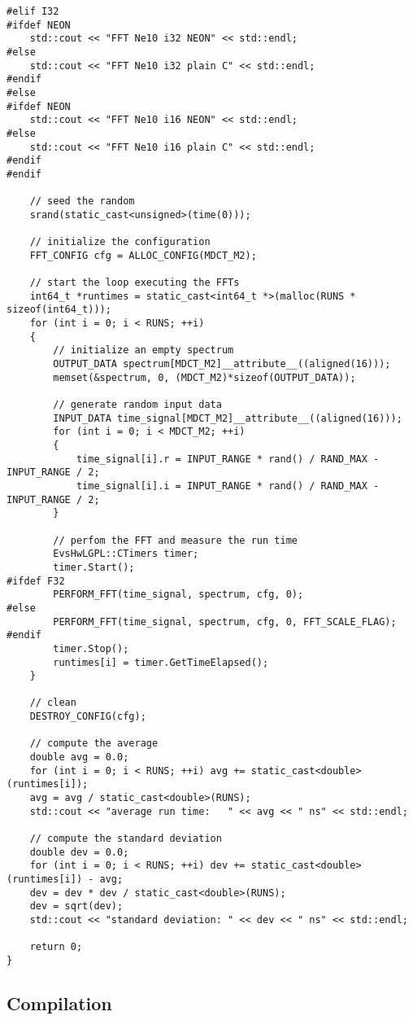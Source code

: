 \documentclass{article}
\begin{document}
\begin{lstlisting}
#elif I32
#ifdef NEON
    std::cout << "FFT Ne10 i32 NEON" << std::endl;
#else
    std::cout << "FFT Ne10 i32 plain C" << std::endl;
#endif
#else
#ifdef NEON
    std::cout << "FFT Ne10 i16 NEON" << std::endl;
#else
    std::cout << "FFT Ne10 i16 plain C" << std::endl;
#endif
#endif

    // seed the random
    srand(static_cast<unsigned>(time(0)));

    // initialize the configuration
    FFT_CONFIG cfg = ALLOC_CONFIG(MDCT_M2);

    // start the loop executing the FFTs
    int64_t *runtimes = static_cast<int64_t *>(malloc(RUNS * sizeof(int64_t)));
    for (int i = 0; i < RUNS; ++i)
    {
        // initialize an empty spectrum
        OUTPUT_DATA spectrum[MDCT_M2]__attribute__((aligned(16)));
        memset(&spectrum, 0, (MDCT_M2)*sizeof(OUTPUT_DATA));

        // generate random input data
        INPUT_DATA time_signal[MDCT_M2]__attribute__((aligned(16)));
        for (int i = 0; i < MDCT_M2; ++i)
        {
            time_signal[i].r = INPUT_RANGE * rand() / RAND_MAX - INPUT_RANGE / 2;
            time_signal[i].i = INPUT_RANGE * rand() / RAND_MAX - INPUT_RANGE / 2;
        }

        // perfom the FFT and measure the run time
        EvsHwLGPL::CTimers timer;
        timer.Start();
#ifdef F32
        PERFORM_FFT(time_signal, spectrum, cfg, 0);
#else
        PERFORM_FFT(time_signal, spectrum, cfg, 0, FFT_SCALE_FLAG);
#endif
        timer.Stop();
        runtimes[i] = timer.GetTimeElapsed();
    }

    // clean
    DESTROY_CONFIG(cfg);

    // compute the average
    double avg = 0.0;
    for (int i = 0; i < RUNS; ++i) avg += static_cast<double>(runtimes[i]);
    avg = avg / static_cast<double>(RUNS);
    std::cout << "average run time:   " << avg << " ns" << std::endl;

    // compute the standard deviation
    double dev = 0.0;
    for (int i = 0; i < RUNS; ++i) dev += static_cast<double>(runtimes[i]) - avg;
    dev = dev * dev / static_cast<double>(RUNS);
    dev = sqrt(dev);
    std::cout << "standard deviation: " << dev << " ns" << std::endl;

    return 0;
}
\end{lstlisting}

\subsection{Compilation}\label{app:perf_fft_ne10_cmake}
\end{document}
